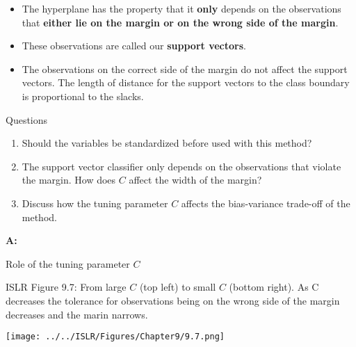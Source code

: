 \documentclass[10pt,ignorenonframetext,]{beamer}
\begin{document}
\begin{frame}

\begin{itemize}
\item
  The hyperplane has the property that it \textbf{only} depends on the
  observations that \textbf{either lie on the margin or on the wrong
  side of the margin}.
\item
  These observations are called our \textbf{support vectors}.
\item
  The observations on the correct side of the margin do not affect the
  support vectors. The length of distance for the support vectors to the
  class boundary is proportional to the slacks.
\end{itemize}

\end{frame}

\begin{frame}

\begin{block}{Questions}

\begin{enumerate}
\def\labelenumi{\arabic{enumi}.}
\item
  Should the variables be standardized before used with this method?
\item
  The support vector classifier only depends on the observations that
  violate the margin. How does \(C\) affect the width of the margin?
\item
  Discuss how the tuning parameter \(C\) affects the bias-variance
  trade-off of the method.
\end{enumerate}

\end{block}

\end{frame}

\begin{frame}

\textbf{A:}

\end{frame}

\begin{frame}

\begin{block}{Role of the tuning parameter \(C\)}

ISLR Figure 9.7: From large \(C\) (top left) to small \(C\) (bottom
right). As C decreases the tolerance for observations being on the wrong
side of the margin decreases and the marin narrows.

\centering
\texttt{[image: ../../ISLR/Figures/Chapter9/9.7.png]}

\end{block}

\end{frame}
\end{document}
